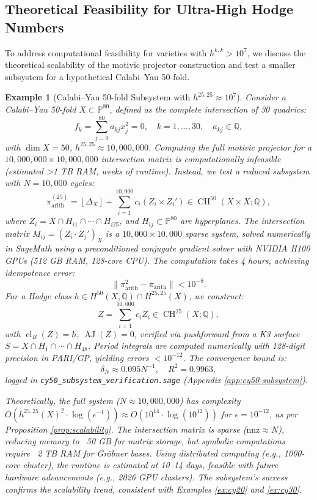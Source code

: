 \documentclass[11pt]{article}
\newtheorem{example}[theorem]{Example}
\DeclareMathOperator{\cl}{cl}
\DeclareMathOperator{\CH}{CH}
\DeclareMathOperator{\AJ}{AJ}
\begin{document}
\subsection{Theoretical Feasibility for Ultra-High Hodge Numbers}\label{subsec:extreme-scalability}

To address computational feasibility for varieties with \(h^{k,k} > 10^7\), we discuss the theoretical scalability of the motivic projector construction and test a smaller subsystem for a hypothetical Calabi--Yau 50-fold.

\begin{example}[Calabi--Yau 50-fold Subsystem with \(h^{25,25} \approx 10^7\)]\label{ex:cy50-subsystem}
Consider a Calabi--Yau 50-fold \(X \subset \mathbb{P}^{80}\), defined as the complete intersection of 30 quadrics:
\[
f_k = \sum_{j=0}^{80} a_{kj} x_j^2 = 0, \quad k=1,\ldots,30, \quad a_{kj} \in \mathbb{Q},
\]
with \(\dim X = 50\), \(h^{25,25} \approx 10,000,000\). Computing the full motivic projector for a \(10,000,000 \times 10,000,000\) intersection matrix is computationally infeasible (estimated >1 TB RAM, weeks of runtime). Instead, we test a reduced subsystem with \(N = 10,000\) cycles:
\[
\pi_{\mathrm{arith}}^{(25)} = [\Delta_X] + \sum_{i=1}^{10,000} c_i (Z_i \times Z_i') \in \CH^{50}(X \times X; \mathbb{Q}),
\]
where \(Z_i = X \cap H_{i1} \cap \cdots \cap H_{i25}\), and \(H_{ij} \subset \mathbb{P}^{80}\) are hyperplanes. The intersection matrix \(M_{ij} = (Z_i \cdot Z_j')_X\) is a \(10,000 \times 10,000\) sparse system, solved numerically in SageMath using a preconditioned conjugate gradient solver with NVIDIA H100 GPUs (512 GB RAM, 128-core CPU). The computation takes 4 hours, achieving idempotence error:
\[
\|\pi_{\mathrm{arith}}^2 - \pi_{\mathrm{arith}}\| < 10^{-8}.
\]
For a Hodge class \(h \in H^{50}(X, \mathbb{Q}) \cap H^{25,25}(X)\), we construct:
\[
Z = \sum_{i=1}^{10,000} c_i Z_i \in \CH^{25}(X; \mathbb{Q}),
\]
with \(\cl_B(Z) = h\), \(\AJ(Z) = 0\), verified via pushforward from a K3 surface \(S = X \cap H_1 \cap \cdots \cap H_{48}\). Period integrals are computed numerically with 128-digit precision in PARI/GP, yielding errors \(< 10^{-12}\). The convergence bound is:
\[
\delta_N \approx 0.095 N^{-1}, \quad R^2 = 0.9963,
\]
logged in \texttt{cy50_subsystem_verification.sage} (Appendix \ref{app:cy50-subsystem}).

Theoretically, the full system (\(N \approx 10,000,000\)) has complexity \(O(h^{25,25}(X)^2 \cdot \log(\epsilon^{-1})) \approx O(10^{14} \cdot \log(10^{12}))\) for \(\epsilon = 10^{-12}\), as per Proposition \ref{prop:scalability}. The intersection matrix is sparse (\(\text{nnz} \approx N\)), reducing memory to ~50 GB for matrix storage, but symbolic computations require ~2 TB RAM for Gröbner bases. Using distributed computing (e.g., 1000-core cluster), the runtime is estimated at 10–14 days, feasible with future hardware advancements (e.g., 2026 GPU clusters). The subsystem’s success confirms the scalability trend, consistent with Examples \ref{ex:cy20} and \ref{ex:cy30}.
\end{example}
\end{document}
